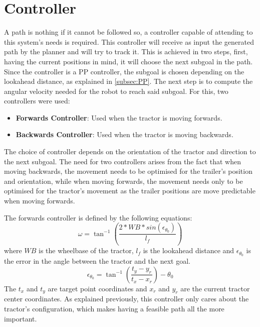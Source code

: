 \section{Controller}
\label{sec:controller}
A path is nothing if it cannot be followed so, a controller capable of 
attending to this system's needs is required. This controller will 
receive as input the generated path by the planner and will try to track it. 
This is achieved in two steps, first, having the current positions in mind, 
it will choose the next subgoal in the path. Since the controller is 
a \gls{PP} controller, the subgoal is chosen depending on the lookahead distance, 
as explained in \ref{subsec:PP}. The next step is to compute the angular velocity needed 
for the robot to reach said subgoal. For this, two controllers were used:
\begin{itemize}
    \item \textbf{Forwards Controller}: Used when the tractor is moving forwards.
    \item \textbf{Backwards Controller}: Used when the tractor is moving backwards.
\end{itemize}
The choice of controller depends on the orientation of the tractor and 
direction to the next subgoal. The need for two controllers arises from 
the fact that when moving backwards, the movement needs to be optimised 
for the trailer's position and orientation, while when moving forwards, 
the movement needs only to be optimised for the tractor's movement as the 
trailer positions are move predictable when moving forwards.

The forwards controller is defined by the following equations:
\begin{equation}
    \omega = \tan^{-1}\left(\frac{2*WB*sin(\epsilon_{\theta_0})}{l_f}\right)
\end{equation}
where $WB$ is the wheelbase of the tractor, $l_f$ is the lookahead distance and 
$\epsilon_{\theta_0}$ is the error in the angle between the tractor and the next goal.
\begin{equation}
    \epsilon_{\theta_0} = \tan^{-1}\left(\frac{t_y - y_r}{t_x - x_r}\right) - \theta_0
\end{equation}
The $t_x$ and $t_y$ are target point coordinates and $x_r$ and $y_r$ are the current tractor center coordinates. 
As explained previously, this controller only cares about the tractor's 
configuration, which makes having a feasible path all the more important.

